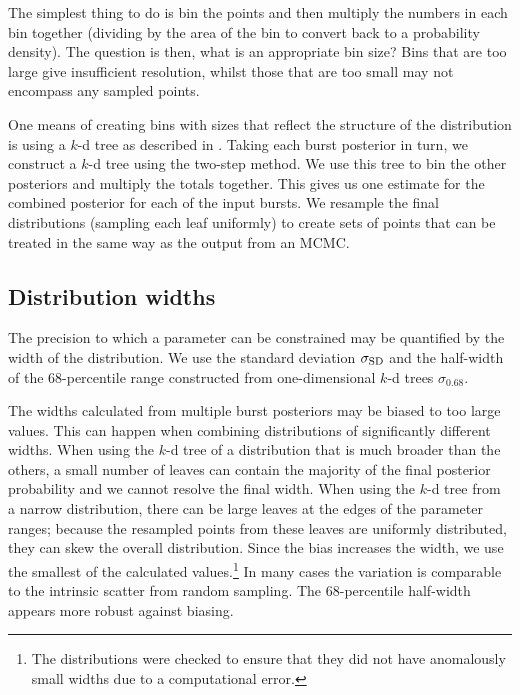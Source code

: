 The simplest thing to do is bin the points and then multiply the numbers in each bin together (dividing by the area of the bin to convert back to a probability density). The question is then, what is an appropriate bin size? Bins that are too large give insufficient resolution, whilst those that are too small may not encompass any sampled points.

One means of creating bins with sizes that reflect the structure of the distribution is using a $k$-d tree as described in . Taking each burst posterior in turn, we construct a $k$-d tree using the two-step method. We use this tree to bin the other posteriors and multiply the totals together. This gives us one estimate for the combined posterior for each of the input bursts. We resample the final distributions (sampling each leaf uniformly) to create sets of points that can be treated in the same way as the output from an MCMC.

\subsection{Distribution widths}

The precision to which a parameter can be constrained may be quantified by the width of the distribution. We use the standard deviation $\sigma_\mathrm{SD}$ and the half-width of the $68$-percentile range constructed from one-dimensional $k$-d trees $\sigma_{0.68}$.

The widths calculated from multiple burst posteriors may be biased to too large values. This can happen when combining distributions of significantly different widths. When using the $k$-d tree of a distribution that is much broader than the others, a small number of leaves can contain the majority of the final posterior probability and we cannot resolve the final width. When using the $k$-d tree from a narrow distribution, there can be large leaves at the edges of the parameter ranges; because the resampled points from these leaves are uniformly distributed, they can skew the overall distribution. Since the bias increases the width, we use the smallest of the calculated values.\footnote{The distributions were checked to ensure that they did not have anomalously small widths due to a computational error.}
In many cases the variation is comparable to the intrinsic scatter from random sampling. The $68$-percentile half-width appears more robust against biasing.


